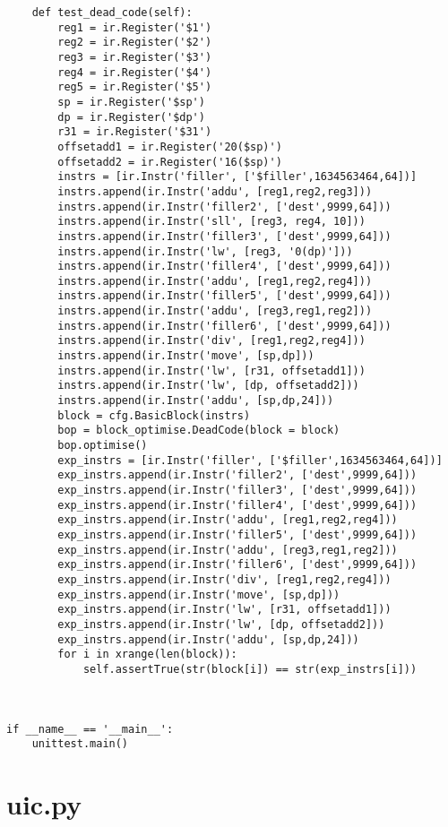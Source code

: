 \begin{lstlisting}
    def test_dead_code(self):
        reg1 = ir.Register('$1')
        reg2 = ir.Register('$2')
        reg3 = ir.Register('$3')
        reg4 = ir.Register('$4')
        reg5 = ir.Register('$5')
        sp = ir.Register('$sp')
        dp = ir.Register('$dp')
        r31 = ir.Register('$31')
        offsetadd1 = ir.Register('20($sp)')
        offsetadd2 = ir.Register('16($sp)')
        instrs = [ir.Instr('filler', ['$filler',1634563464,64])]
        instrs.append(ir.Instr('addu', [reg1,reg2,reg3]))
        instrs.append(ir.Instr('filler2', ['dest',9999,64]))
        instrs.append(ir.Instr('sll', [reg3, reg4, 10]))
        instrs.append(ir.Instr('filler3', ['dest',9999,64]))
        instrs.append(ir.Instr('lw', [reg3, '0(dp)']))
        instrs.append(ir.Instr('filler4', ['dest',9999,64]))
        instrs.append(ir.Instr('addu', [reg1,reg2,reg4]))
        instrs.append(ir.Instr('filler5', ['dest',9999,64]))
        instrs.append(ir.Instr('addu', [reg3,reg1,reg2]))
        instrs.append(ir.Instr('filler6', ['dest',9999,64]))
        instrs.append(ir.Instr('div', [reg1,reg2,reg4]))
        instrs.append(ir.Instr('move', [sp,dp]))
        instrs.append(ir.Instr('lw', [r31, offsetadd1]))
        instrs.append(ir.Instr('lw', [dp, offsetadd2]))
        instrs.append(ir.Instr('addu', [sp,dp,24]))
        block = cfg.BasicBlock(instrs)
        bop = block_optimise.DeadCode(block = block)
        bop.optimise()
        exp_instrs = [ir.Instr('filler', ['$filler',1634563464,64])]
        exp_instrs.append(ir.Instr('filler2', ['dest',9999,64]))
        exp_instrs.append(ir.Instr('filler3', ['dest',9999,64]))
        exp_instrs.append(ir.Instr('filler4', ['dest',9999,64]))
        exp_instrs.append(ir.Instr('addu', [reg1,reg2,reg4]))
        exp_instrs.append(ir.Instr('filler5', ['dest',9999,64]))
        exp_instrs.append(ir.Instr('addu', [reg3,reg1,reg2]))
        exp_instrs.append(ir.Instr('filler6', ['dest',9999,64]))
        exp_instrs.append(ir.Instr('div', [reg1,reg2,reg4]))
        exp_instrs.append(ir.Instr('move', [sp,dp]))
        exp_instrs.append(ir.Instr('lw', [r31, offsetadd1]))
        exp_instrs.append(ir.Instr('lw', [dp, offsetadd2]))
        exp_instrs.append(ir.Instr('addu', [sp,dp,24]))
        for i in xrange(len(block)):
            self.assertTrue(str(block[i]) == str(exp_instrs[i]))



if __name__ == '__main__':
    unittest.main()
\end{lstlisting}


\newpage
\section{uic.py}



